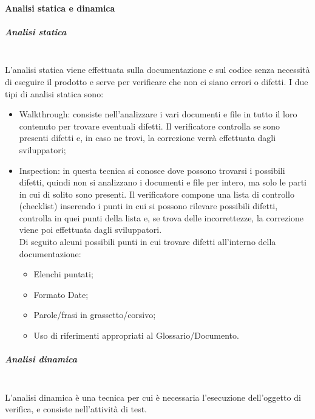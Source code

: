         \paragraph{Analisi statica e dinamica}
            \subparagraph{Analisi statica}\mbox{}\\
                L'analisi statica viene effettuata sulla documentazione e sul codice senza necessità di eseguire il prodotto e serve per verificare che non ci siano errori o difetti. I due tipi di analisi statica sono:
                \begin{itemize}
                    \item Walkthrough: consiste nell'analizzare i vari documenti e file in tutto il loro contenuto per trovare eventuali difetti. Il verificatore controlla se sono presenti difetti e, in caso ne trovi, la correzione verrà effettuata dagli sviluppatori; 
                    \item Inspection: in questa tecnica si conosce dove possono trovarsi i possibili difetti, quindi non si analizzano i documenti e file per intero, ma solo le parti in cui di solito sono presenti. Il verificatore compone una lista di controllo (checklist) inserendo i punti in cui si possono rilevare possibili difetti, controlla in quei punti della lista e, se trova delle incorrettezze, la correzione viene poi effettuata dagli sviluppatori. \\
			Di seguito alcuni possibili punti in cui trovare difetti all'interno della documentazione:
			\begin{itemize}
				\item Elenchi puntati;
				\item Formato Date;
				\item Parole/frasi in grassetto/corsivo;
				\item Uso di riferimenti appropriati al Glossario/Documento.
			\end{itemize}
                \end{itemize}
            \subparagraph{Analisi dinamica}\mbox{}\\
		L'analisi dinamica è una tecnica per cui è necessaria l'esecuzione dell'oggetto di verifica, e consiste nell'attività di test.

